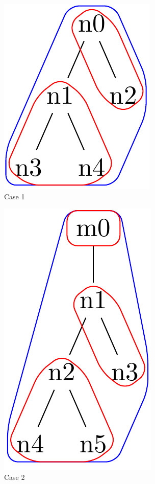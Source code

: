 \documentclass{article}
\begin{document}
\begin{figure}[ht]
	\begin{subfigure}{2cm}
		\includegraphics[scale=0.22]{F4C1Tree}
		\caption{Case 1}
		\label{rank:subim1}
	\end{subfigure}
	\begin{subfigure}{2cm}
		\includegraphics[scale=0.21]{F4C2Tree}
		\caption{Case 2}
		\label{rank:subim2}
	\end{subfigure}
	\begin{subfigure}{3cm}

\end{subfigure}
\end{figure}
\end{document}
